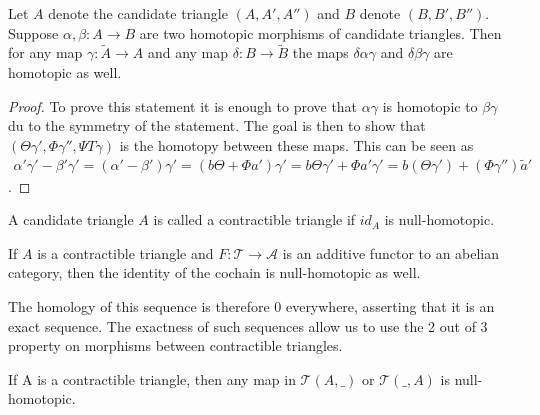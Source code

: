     \begin{lemma}
        Let $A$ denote the candidate triangle $(A,A',A'')$ and $B$ denote $(B,B',B'')$. Suppose $\alpha, \beta : A \rightarrow B$ are two homotopic morphisms of candidate triangles. Then for any map $\gamma : \widetilde{A} \rightarrow A$ and any map $\delta : B \rightarrow \widetilde{B}$ the maps $\delta\alpha\gamma$ and $\delta\beta\gamma$ are homotopic as well.
    \end{lemma}

    \begin{proof}
        To prove this statement it is enough to prove that $\alpha\gamma$ is homotopic to $\beta\gamma$ du to the symmetry of the statement. The goal is then to show that $(\Theta\gamma ',\Phi\gamma '',\Psi T\gamma)$ is the homotopy between these maps. This can be seen as
        \begin{multline*}
            {\alpha}'{\gamma}'-{\beta}'{\gamma}' = ({\alpha}'-{\beta}'){\gamma}' = (b\Theta +\Phi a'){\gamma}' = b\Theta {\gamma}' + \Phi a'{\gamma}' = b({\Theta}{\gamma}') + ({\Phi}{\gamma}'')\widetilde{a}'
        \end{multline*}.
    \end{proof}

    \begin{definition}
        A candidate triangle $A$ is called a contractible triangle if $id_A$ is null-homotopic.
    \end{definition}

    \begin{remark}
        If $A$ is a contractible triangle and $F:\mathcal{T}\rightarrow \mathcal{A}$ is an additive functor to an abelian category, then the identity of the cochain is null-homotopic as well.
        \begin{center}
        \end{center}
        The homology of this sequence is therefore $0$ everywhere, asserting that it is an exact sequence.
        The exactness of such sequences allow us to use the 2 out of 3 property on morphisms between contractible triangles.
    \end{remark}

    \begin{corollary}
        If A is a contractible triangle, then any map in $\mathcal{T}(A,\_)$ or $\mathcal{T}(\_,A)$ is null-homotopic.
    \end{corollary}

